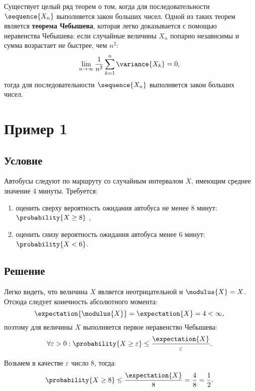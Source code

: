 Существует целый ряд теорем о том, когда для последовательности $\sequence{X_n}$ выполняется закон больших чисел.
Одной из таких теорем является \textbf{теорема Чебышева}, которая легко доказывается с помощью неравенства Чебышева:
если случайные величины $X_n$ попарно независимы и сумма возрастает не быстрее, чем $n^2$:
\begin{equation}
    \lim_{n \rightarrow \infty} \frac{1}{n^2} \sum_{k=1}^n \variance{X_k} = 0 ,
\end{equation}
тогда для последовательности $\sequence{X_n}$ выполняется закон больших чисел.


\section{Пример 1}
\subsection*{Условие}
Автобусы следуют по маршруту со случайным интервалом $X$, имеющим среднее значение 4 минуты. Требуется:
\begin{enumerate}
    \item оценить сверху вероятность ожидания автобуса не менее 8 минут: $\probability{X \ge 8}$ ,
    \item оценить снизу вероятность ожидания автобуса менее 6 минут: $\probability{X < 6}$.
\end{enumerate}

\subsection*{Решение}
Легко видеть, что величина $X$ является неотрицательной и $\modulus{X} = X$. Отсюда следует конечность абсолютного момента:
\begin{equation}
    \expectation{\modulus{X}} = \expectation{X} = 4 < \infty ,
\end{equation}
поэтому для величины $X$ выполняется первое неравенство Чебышева:
\begin{equation}
    \forall \varepsilon > 0 : \probability{X \ge \varepsilon} \le \frac{\expectation{X}}{\varepsilon} .
\end{equation}

Возьмем в качестве $\varepsilon$ число 8, тогда:
\begin{equation}
    \probability{X \ge 8} \le \frac{\expectation{X}}{8} = \frac{4}{8} = \frac{1}{2}.
\end{equation}


